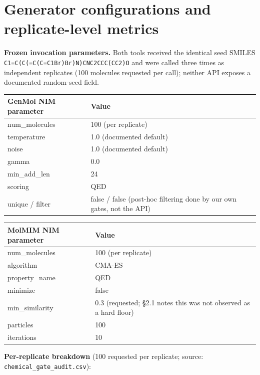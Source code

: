 \documentclass{article}
\begin{document}
\FloatBarrier
\section{Generator configurations and replicate-level metrics}
\label{app:a}

\textbf{Frozen invocation parameters.} Both tools received the identical seed SMILES \texttt{C1=C(C(=C(C=C1Br)Br)N)CNC2CCC(CC2)O} and were called three times as independent replicates (100 molecules requested per call); neither API exposes a documented random-seed field.

\begin{table}[h]
\centering
\footnotesize
\begin{tabular}{ll}
\toprule
GenMol NIM parameter & Value \\
\midrule
num\_molecules & 100 (per replicate) \\
temperature & 1.0 (documented default) \\
noise & 1.0 (documented default) \\
gamma & 0.0 \\
min\_add\_len & 24 \\
scoring & QED \\
unique / filter & false / false (post-hoc filtering done by our own gates, not the API) \\
\bottomrule
\end{tabular}
\hspace{1em}
\begin{tabular}{ll}
\toprule
MolMIM NIM parameter & Value \\
\midrule
num\_molecules & 100 (per replicate) \\
algorithm & CMA-ES \\
property\_name & QED \\
minimize & false \\
min\_similarity & 0.3 (requested; \S2.1 notes this was not observed as a hard floor) \\
particles & 100 \\
iterations & 10 \\
\bottomrule
\end{tabular}
\end{table}

\textbf{Per-replicate breakdown} (100 requested per replicate; source: \texttt{chemical\_gate\_audit.csv}):
\end{document}
